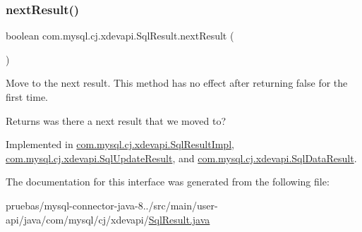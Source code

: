 \subsubsection{\texorpdfstring{next\+Result()}{nextResult()}}
{\footnotesize\ttfamily boolean com.\+mysql.\+cj.\+xdevapi.\+Sql\+Result.\+next\+Result (\begin{DoxyParamCaption}{ }\end{DoxyParamCaption})}

Move to the next result. This method has no effect after returning {\ttfamily false} for the first time.

\begin{DoxyReturn}{Returns}
was there a next result that we moved to? 
\end{DoxyReturn}


Implemented in \mbox{\hyperlink{classcom_1_1mysql_1_1cj_1_1xdevapi_1_1_sql_result_impl_a63d1fa4f9bdb44615cb07d3324e96341}{com.\+mysql.\+cj.\+xdevapi.\+Sql\+Result\+Impl}}, \mbox{\hyperlink{classcom_1_1mysql_1_1cj_1_1xdevapi_1_1_sql_update_result_a3fad012f9b23f87f7aac62edd51c604a}{com.\+mysql.\+cj.\+xdevapi.\+Sql\+Update\+Result}}, and \mbox{\hyperlink{classcom_1_1mysql_1_1cj_1_1xdevapi_1_1_sql_data_result_a4dc2d012228a58a9ebe74f93f9a007a9}{com.\+mysql.\+cj.\+xdevapi.\+Sql\+Data\+Result}}.



The documentation for this interface was generated from the following file\+:\begin{DoxyCompactItemize}
\item 
pruebas/mysql-\/connector-\/java-\/8../src/main/user-\/api/java/com/mysql/cj/xdevapi/\mbox{\hyperlink{_sql_result_8java}{Sql\+Result.\+java}}\end{DoxyCompactItemize}
